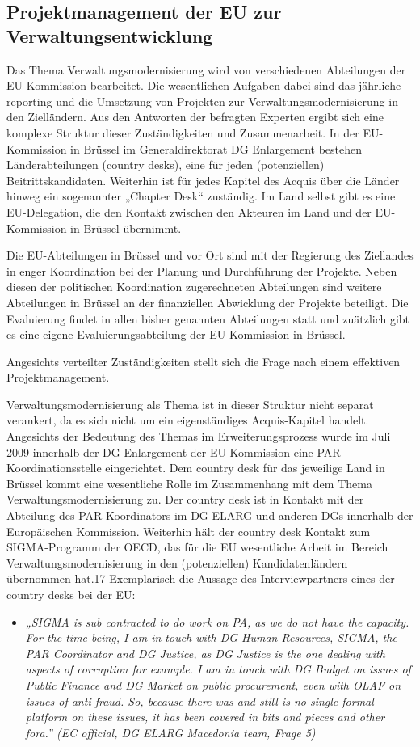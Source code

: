 \subsection{Projektmanagement der EU zur Verwaltungsentwicklung}
Das Thema Verwaltungsmodernisierung wird von verschiedenen Abteilungen der EU-Kommission bearbeitet. Die wesentlichen Aufgaben dabei sind das jährliche reporting und die Umsetzung von Projekten zur Verwaltungsmodernisierung in den Zielländern. Aus den Antworten der befragten Experten ergibt sich eine komplexe Struktur dieser Zuständigkeiten und Zusammenarbeit. In der EU-Kommission in Brüssel im Generaldirektorat DG Enlargement bestehen Länderabteilungen (country desks), eine für jeden (potenziellen) Beitrittskandidaten. Weiterhin ist für jedes Kapitel des Acquis über die Länder hinweg ein sogenannter „Chapter Desk“ zuständig. Im Land selbst gibt es eine EU-Delegation, die den Kontakt zwischen den Akteuren im Land und der EU-Kommission in Brüssel übernimmt.\par
Die EU-Abteilungen in Brüssel und vor Ort sind mit der Regierung des Ziellandes in enger Koordination bei der Planung und Durchführung der Projekte. Neben diesen der politischen Koordination zugerechneten Abteilungen sind weitere Abteilungen in Brüssel an der finanziellen Abwicklung der Projekte beteiligt. Die Evaluierung findet in allen bisher genannten Abteilungen statt und zuätzlich gibt es eine eigene Evaluierungsabteilung der EU-Kommission in Brüssel.\par
Angesichts verteilter Zuständigkeiten stellt sich die Frage nach einem effektiven Projektmanagement.
\par
Verwaltungsmodernisierung als Thema ist in dieser Struktur nicht separat verankert, da es sich nicht um ein eigenständiges Acquis-Kapitel handelt. Angesichts der Bedeutung des Themas im Erweiterungsprozess wurde im Juli 2009 innerhalb der DG-Enlargement der EU-Kommission eine PAR-Koordinationsstelle eingerichtet. Dem country desk für das jeweilige Land in Brüssel kommt eine wesentliche Rolle im Zusammenhang mit dem Thema Verwaltungsmodernisierung zu. Der country desk ist in Kontakt mit der Abteilung des PAR-Koordinators im DG ELARG und anderen DGs innerhalb der Europäischen Kommission. Weiterhin hält der country desk Kontakt zum SIGMA-Programm der OECD, das für die EU wesentliche Arbeit im Bereich Verwaltungsmodernisierung in den (potenziellen) Kandidatenländern übernommen hat.17 Exemplarisch die Aussage des Interviewpartners eines der country desks bei der EU:
\begin{itemize}[label={}]
\item \textit{„SIGMA is sub contracted to do work on PA, as we do not have the capacity. For the time being, I am in touch with DG Human Resources, SIGMA, the PAR Coordinator and DG Justice, as DG Justice is the one dealing with aspects of corruption for example. I am in touch with DG Budget on issues of Public Finance and DG Market on public procurement, even with OLAF on issues of anti-fraud. So, because there was and still is no single formal platform on these issues, it has been covered in bits and pieces and other fora.” (EC official, DG ELARG Macedonia team, Frage 5)}
\end{itemize}
